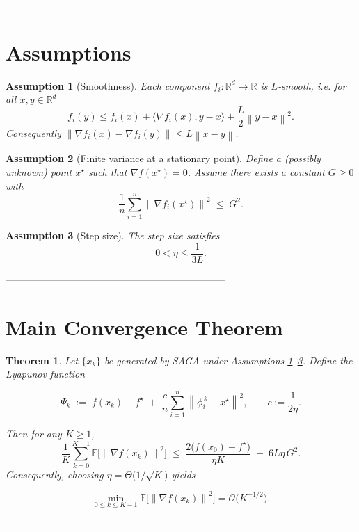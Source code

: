 \documentclass{article}
\newtheorem{theorem}{Theorem}
\newtheorem{assumption}{Assumption}
\newcommand{\E}{\mathbb{E}}
\newcommand{\R}{\mathbb{R}}
\newcommand{\norm}[1]{\left\lVert #1\right\rVert}
\newcommand{\grad}{\nabla}
\begin{document}
--------------------------------------------------------------------

\section*{Assumptions}
\begin{assumption}[Smoothness]\label{as:smooth}
Each component $f_i:\R^{d}\to\R$ is $L$‑smooth, i.e. for all $x,y\in\R^{d}$
\[
f_i(y)\le f_i(x)+\langle\grad f_i(x),y-x\rangle+\frac{L}{2}\norm{y-x}^{2}.
\]
Consequently $\norm{\grad f_i(x)-\grad f_i(y)}\le L\norm{x-y}$.
\end{assumption}

\begin{assumption}[Finite variance at a stationary point]\label{as:var}
Define a (possibly unknown) point $x^{\star}$ such that $\grad f(x^{\star})=0$.
Assume there exists a constant $G\ge0$ with
\[
\frac{1}{n}\sum_{i=1}^{n}\norm{\grad f_i(x^{\star})}^{2}\;\le\; G^{2}.
\]
\end{assumption}

\begin{assumption}[Step size]\label{as:stepsize}
The step size satisfies
\[
0<\eta\le\frac{1}{3L}.
\]
\end{assumption}

--------------------------------------------------------------------

\section*{Main Convergence Theorem}
\begin{theorem}\label{thm:main}
Let $\{x_k\}$ be generated by SAGA under Assumptions \ref{as:smooth}–\ref{as:stepsize}.
Define the Lyapunov function  

\[
\Psi_k \;:=\; f(x_k)-f^{\star}
          \;+\;\frac{c}{n}\sum_{i=1}^{n}\norm{\phi_i^{\,k}-x^{\star}}^{2},
\qquad c:=\frac{1}{2\eta}.
\]

Then for any $K\ge1$,
\[
\frac{1}{K}\sum_{k=0}^{K-1}\E\!\bigl[\norm{\grad f(x_k)}^{2}\bigr]
\;\le\;
\frac{2\bigl(f(x_0)-f^{\star}\bigr)}{\eta K}
\;+\;6L\eta\,G^{2}. \tag{4}
\]
Consequently, choosing $\eta = \Theta\!\bigl(1/\sqrt{K}\bigr)$ yields  

\[
\min_{0\le k\le K-1}\E\!\bigl[\norm{\grad f(x_k)}^{2}\bigr]
= \mathcal{O}\!\bigl(K^{-1/2}\bigr).
\]
\end{theorem}

--------------------------------------------------------------------
\end{document}
